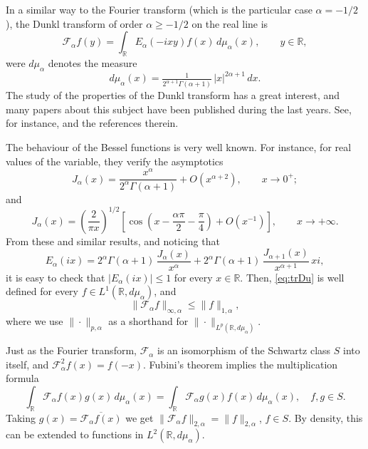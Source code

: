 \documentclass[a4paper]{amsart}
\numberwithin{equation}{section}
\theoremstyle{plain}
\theoremstyle{remark}
\newcommand{\R}{\mathbb{R}}
\newcommand{\Fa}{\mathcal{F}_\alpha} %
\newcommand{\mua}{\mu_\alpha}
\newcommand{\pa}{{p,\alpha}}
\begin{document}
In a similar way to the Fourier transform (which is the particular case $\alpha = -1/2$), the Dunkl transform of order $\alpha \ge -1/2$ on the real line is
\begin{equation}
\label{eq:trDu}
  \Fa f(y)
  = \int_{\R} E_\alpha(-ixy)f(x)\,d\mua(x),
  \qquad y \in \R, 
\end{equation}
were $d\mua$ denotes the measure
$$
  d\mua(x) = \tfrac{1}{2^{\alpha+1}\Gamma(\alpha+1)}\, |x|^{2\alpha+1}\,dx.
$$
The study of the properties of the Dunkl transform has a great interest, and many papers about this subject have been published during the last years.
See, for instance, \cite{Tr, CV, ThX, BMR, KY, DW1, ACV-EM, DW2, Gh, Gon} and the references therein.

The behaviour of the Bessel functions is very well known. For instance, for real values of the variable, they verify the asymptotics
\begin{equation}
\label{eq:zero}
  J_\alpha(x) = \frac{x^\alpha}{2^\alpha \Gamma(\alpha+1)} + O(x^{\alpha+2}),
    \qquad x \to 0^+;
\end{equation}
and
\begin{equation}
\label{eq:infty}
  J_\alpha(x) = \left(\frac{2}{\pi x}\right)^{1/2}\left[ \cos\left(x-\frac{\alpha\pi}2
    - \frac\pi4 \right) + O(x^{-1}) \right], \qquad x \to +\infty.
\end{equation}
From these and similar results, and noticing that
\begin{equation}
\label{eq:Eix}
  E_\alpha(ix) = 2^\alpha \Gamma(\alpha+1) \, \frac{J_\alpha(x)}{x^\alpha}
  + 2^\alpha \Gamma(\alpha+1) \, \frac{J_{\alpha+1}(x)}{x^{\alpha+1}}\,xi,
\end{equation}
it is easy to check that $|E_\alpha(i x)| \le 1$ for every $x \in \R$. Then, \eqref{eq:trDu} is well defined for every $f \in L^1(\R,d\mua)$, and
\begin{equation}
\label{eq:L1infty}
  \|\Fa f\|_{\infty,\alpha} \le \|f\|_{1,\alpha},
\end{equation}
where we use $\|\cdot\|_\pa$ as a shorthand for $\|\cdot\|_{L^p(\R,d\mua)}$.

Just as the Fourier transform, $\Fa$ is an isomorphism of the Schwartz class $S$ into itself, and $\Fa^2f(x) = f(-x)$. Fubini's theorem implies the multiplication formula
$$
  \int_\R \Fa f(x)g(x) \,d\mua(x)
  = \int_\R \Fa g(x)f(x) \,d\mua(x),
  \quad f,g \in S.
$$
Taking $g(x) = \overline{\Fa f(x)}$ we get $\|\Fa f\|_{2,\alpha} = \|f\|_{2,\alpha}$, $f \in S$. By density, this can be extended to functions in $L^2(\R,d\mua)$.
\end{document}
